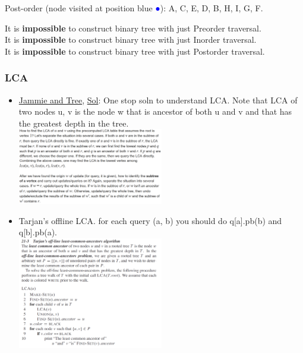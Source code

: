 \documentclass[8pt, a4paper, oneside, twocolumn]{extarticle}
\begin{document}
Post-order (node visited at position blue \textcolor{blue}{●}): A, C, E, D, B, H, I, G, F.

It is \textbf {impossible} to construct binary tree with just Preorder traversal.\\ 
It is \textbf {impossible} to construct binary tree with just Inorder traversal.\\
It is \textbf {impossible} to construct binary tree with just Postorder traversal.
\subsubsection{LCA}
\begin{itemize}[leftmargin=*]
    \item \href {https://codeforces.com/contest/916/problem/E}{Jammie and Tree}, \href {https://github.com/sourabhxyz/Competitive-Programming/blob/master/CF/457D2/E.cpp}{Sol}: One stop soln to understand LCA. Note that LCA of two nodes u, v is the node w that is ancestor of both u and v and that has the greatest depth in the tree.\\\includegraphics[width=0.5\textwidth,height=0.5\textheight,keepaspectratio]{assets/lca}
    \item Tarjan's offline LCA. for each query (a, b) you should do q[a].pb(b) and q[b].pb(a).
\\\includegraphics[width=0.5\textwidth,height=0.5\textheight,keepaspectratio]{assets/tar}
\end{itemize}
\end{document}
